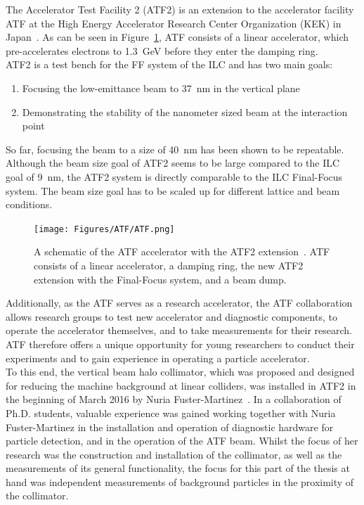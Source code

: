 The Accelerator Test Facility 2 (ATF2) is an extension to the accelerator facility ATF at the High Energy Accelerator Research Center Organization (KEK) in Japan~\cite{ATF}. 
As can be seen in Figure~\ref{fig:ATF}, ATF consists of a linear accelerator, which pre-accelerates electrons to \SI{1.3}{\GeV} before they enter the damping ring. 
\\ATF2 is a test bench for the FF system of the ILC and has two main goals: 
\begin{enumerate}
 \item Focusing the low-emittance beam to \SI{37}{\nano\metre} in the vertical plane
 \item Demonstrating the stability of the nanometer sized beam at the interaction point
\end{enumerate}
So far, focusing the beam to a size of \SI{40}{\nano\metre} has been shown to be repeatable. 
Although the beam size goal of ATF2 seems to be large compared to the ILC goal of \SI{9}{\nano\metre}, the ATF2 system is directly comparable to the ILC Final-Focus system. 
The beam size goal has to be scaled up for different lattice and beam conditions.\\
\begin{figure}
\centering
\texttt{[image: Figures/ATF/ATF.png]}
\caption[ATF accelerator]{A schematic of the ATF accelerator with the ATF2 extension~\cite[cf. p. 65]{Nuria_Thesis}.
ATF consists of a linear accelerator, a damping ring, the new ATF2 extension with the Final-Focus system, and a beam dump.}
\label{fig:ATF}
\end{figure}
Additionally, as the ATF serves as a research accelerator, the ATF collaboration allows research groups to test new accelerator and diagnostic components, to operate the accelerator themselves, and to take measurements for their research.
ATF therefore offers a unique opportunity for young researchers to conduct their experiments and to gain experience in operating a particle accelerator.
\\To this end, the vertical beam halo collimator, which was proposed and designed for reducing the machine background at linear colliders, was installed in ATF2 in the beginning of March 2016 by Nuria Fuster-Martinez~\cite{Nuria_Thesis}. 
In a collaboration of Ph.D. students, valuable experience was gained working together with Nuria Fuster-Martinez in the installation and operation of diagnostic hardware for particle detection, and in the operation of the ATF beam.
Whilst the focus of her research was the construction and installation of the collimator, as well as the measurements of its general functionality, the focus for this part of the thesis at hand was independent measurements of background particles in the proximity of the collimator.
